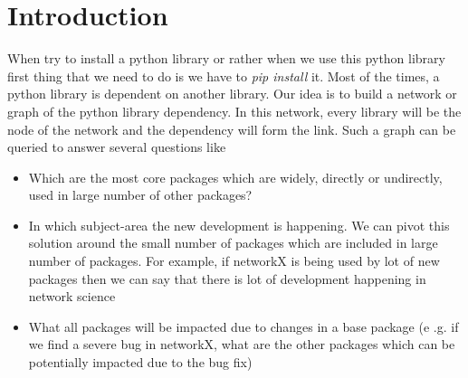 \section{Introduction} \label{intro}
When try to install a python library or rather when we use this python 
library first thing that we need to do is we have to \textit{pip install} it.
Most of the times, a python library is dependent on another library. Our idea
 is to build a network or graph of the python library dependency. In this
 network, every library will be the node of the network and the dependency
 will form the link.
 Such a graph can be queried to answer several questions like
\begin{itemize}
\item Which are the most core packages which are widely, directly or
undirectly, used in large number of other packages?
\item In which subject-area the new development is happening. We can pivot
this solution around the small number of packages which are included in large
 number of packages. For example, if networkX is being used by lot of new
 packages then we can say that there is lot of development happening in
 network science
\item What all packages will be impacted due to changes in a base package (e
.g. if we find a severe bug in networkX, what are the other packages which
can be potentially impacted due to the bug fix)
\end{itemize}
  